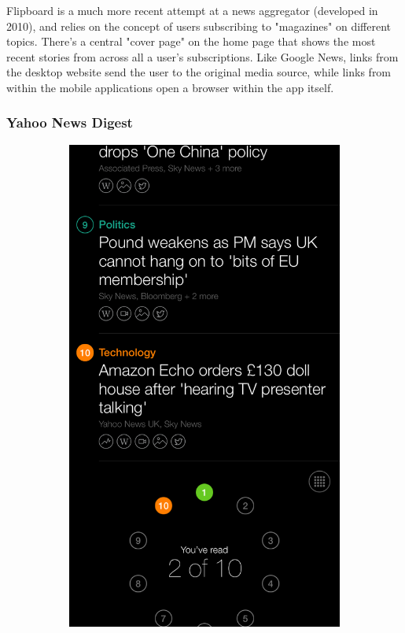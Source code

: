 \documentclass[12pt]{article}
\begin{document}
Flipboard\cite{flipboard} is a much more recent attempt at a news aggregator (developed in 2010), and relies on the concept of users subscribing to "magazines" on different topics. There's a central "cover page" on the home page that shows the most recent stories from across all a user's subscriptions. Like Google News, links from the desktop website send the user to the original media source, while links from within the mobile applications open a browser within the app itself.

\subsubsection{Yahoo News Digest}

\begin{figure}[ht!]
  \centering
  \begin{subfigure}[t]{0.3\textwidth}
        \includegraphics[width=\textwidth]{YNDHome.PNG}

\end{subfigure}
\end{figure}
\end{document}

